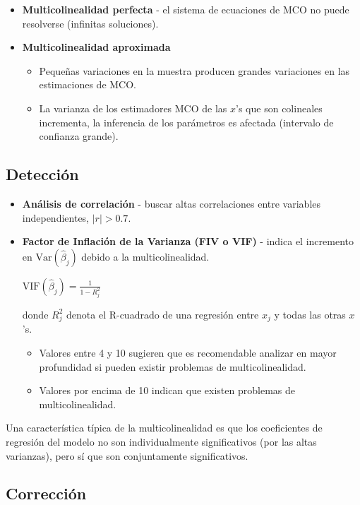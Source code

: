 \documentclass[10pt, a4paper, landscape]{extarticle}
\newcommand{\Var}{\mathrm{Var}}
\begin{document}
\begin{multicols}{3}
\begin{itemize}[leftmargin=*]
	\item \textbf{Multicolinealidad perfecta} - el sistema de ecuaciones de MCO no puede resolverse (infinitas soluciones).
	\item \textbf{Multicolinealidad aproximada}
	\begin{itemize}[leftmargin=*]
		\item Pequeñas variaciones en la muestra producen grandes variaciones en las estimaciones de MCO.
		\item La varianza de los estimadores MCO de las $x$'s que son colineales incrementa, la inferencia de los parámetros es afectada (intervalo de confianza grande).
	\end{itemize}
\end{itemize}

\subsection*{Detección}

\begin{itemize}[leftmargin=*]
	\item \textbf{Análisis de correlación} - buscar altas correlaciones entre variables independientes, $\lvert r \rvert > 0.7$.
	\item \textbf{Factor de Inflación de la Varianza (FIV o VIF)} - indica el incremento en $\Var(\hat{\beta}_j)$ debido a la multicolinealidad.
	\begin{center}
			$\mathrm{VIF} (\hat{\beta}_j) = \frac{1}{1-R_j^2}$
	\end{center}
	donde $R^2_j$ denota el R-cuadrado de una regresión entre $x_j$ y todas las otras $x$'s. 
	\begin{itemize}[leftmargin=*]
		\item Valores entre 4 y 10 sugieren que es recomendable analizar en mayor profundidad si pueden existir problemas de multicolinealidad.
		\item Valores por encima de 10 indican que existen problemas de multicolinealidad.
	\end{itemize}
\end{itemize}

Una característica típica de la multicolinealidad es que los coeficientes de regresión del modelo no son individualmente significativos (por las altas varianzas), pero sí que son conjuntamente significativos.

\subsection*{Corrección}


\end{multicols}
\end{document}

